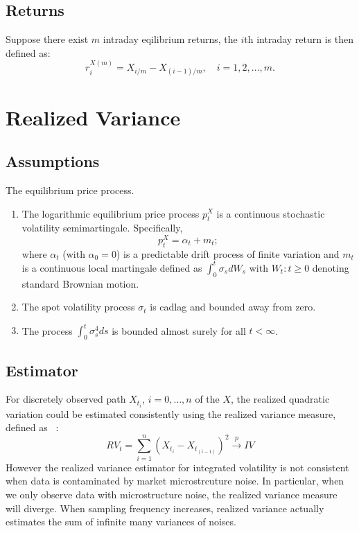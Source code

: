 \documentclass[letterpaper]{report}
\begin{document}
\subsection{Returns}
Suppose there exist $m$ intraday eqilibrium returns, the $i$th intraday return is
then defined as:
\begin{equation}
r_i^{X(m)}= X_{i/m} - X_{(i-1)/m}, \quad i = 1,2,\ldots,m.
\end{equation}



\section{Realized Variance}
\subsection{Assumptions}
The equilibrium price process.
\begin{enumerate}
\item The logarithmic equilibrium price process $p_t^X$
is a continuous stochastic volatility semimartingale. Specifically,
\begin{equation}
p_t^X = \alpha_t + m_t;
\end{equation}
where $\alpha_t$ (with $\alpha_0 =0$) is a predictable drift process of
finite variation and $m_t$ is a continuous local martingale defined as
$\int_0^t\sigma_s dW_s$ with ${W_t: t\geq 0}$ denoting standard Brownian motion.
\item The spot volatility process $\sigma_t$ is cadlag and bounded away from
zero.
\item The process $\int_0^t\sigma_s^4ds$ is bounded almost surely for all $t <
\infty$.
\end{enumerate}
\subsection{Estimator}
For discretely observed path $X_{t_i}$, $i = 0,\ldots, n$ of the $X$, the
realized quadratic variation could be estimated consistently using the realized
variance measure, defined as ~\cite[Zu and Boswijk, 2014]{Zu_Boswijk}:
\begin{equation}
RV_t=\sum_{i=1}^n (X_{t_i}-X_{t_{(i-1)}})^2 \stackrel{p}{\to} IV
\end{equation}
However the realized variance estimator for integrated volatility is not consistent when data is
contaminated by market microstrcuture noise. In particular, when we only observe
data with microstructure noise, the realized variance measure will
diverge. When sampling frequency increases, realized variance actually estimates
the sum of infinite many variances of noises.
\end{document}
